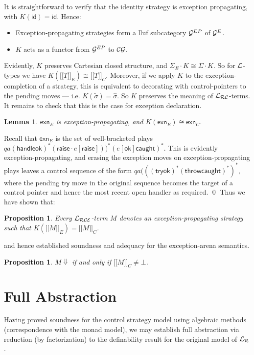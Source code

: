 \documentclass{eptcs}
\def\[{\ensuremath{[ \! [}}
\def\]{\ensuremath{] \! ]}}
\def\G{{\cal{G}}}
\def\L{{\cal{L}}}
\newcommand{\thro}{{\mathsf{throw}}}
\newcommand{\CG}{{\cal{CG}}}
\newcommand{\ok}{{\mathsf{ok}}}
\newcommand{\caught}{{\mathsf{caught}}}
\newcommand{\Lr}{{\cal{L_R}}}
\newcommand{\Lc}{{\cal{L_{RC}}}}
\newcommand{\Lce}{{\cal{L_{RCE}}}}
\newcommand{\xcell}{{\mathsf{exn}}}
\newcommand{\raze}{{\mathsf{raise}}}
\newcommand{\id}{{\mathsf{id}}}
\newtheorem{lemma}[theorem]{Lemma}
\newtheorem{proposition}[theorem]{Proposition}
\newif\ifqed
\newcommand{\qed}{\global\qedfalse\noindent\unskip\penalty50\null\nobreak\hskip1em\nobreak\hfill$\Box$}
\let\Box\undefined
\newenvironment{proof}[1][Proof]{\global\qedtrue\trivlist\item[\hskip\labelsep\textsc{#1:}]}{\ifqed\qed\fi\endtrivlist}
\begin{document}
{It is straightforward to verify that the identity strategy is exception propagating, with $K(\id) = \id$. Hence:
\begin{itemize}
\item Exception-propagating strategies  form a lluf subcategory $\G^{EP}$ of $\G^E$. 
\item $K$ acts as a functor from $\G^{EP}$ to $\CG$.
\end{itemize}
 Evidently, $K$  preserves Cartesian closed structure, and $\Sigma_E \cdot K \cong \Sigma \cdot K$. So for $\L$-types we have $K(\[T\]_{E}) \cong \[T\]_C$. Moreover, if we  apply $K$ to the exception-completion of a strategy, this is equivalent to decorating with control-pointers to the pending moves --- i.e. $K(\widetilde{\sigma}) = \widehat{\sigma}$. So $K$ preserves the meaning of $\Lc$-terms. It remains to check that this is the case for exception declaration.
\begin{lemma}$\xcell_E$ is exception-propagating, and  $K(\xcell_E) \cong \xcell_C$. 
\end{lemma}
\begin{proof}
Recall that $\xcell_E$ is the set of well-bracketed plays $qa ({\mathsf{handle}}\ok)^* (\raze\cdot e[\raze]))^*(e[\ok]\caught)^*$. This is evidently exception-propagating, and erasing the exception moves on exception-propagating plays leaves a control sequence  of the form $qa(((\mathsf{try}\ok)^*(\thro\caught)^*)^*$, where  the pending $\mathsf{try}$ move in the original sequence becomes the target of a control pointer and hence the most recent open handler as required. 
\end{proof}
Thus we have shown that:
\begin{proposition}Every $\Lce$-term $M$ denotes an exception-propagating strategy such that $K(\[M\]_{E}) = \[M\]_{C}$.  
\end{proposition}
and hence established soundness and adequacy for the exception-arena semantics. 
\begin{proposition}$M \Downarrow$ if and only if $\[M\]_C \not=\bot$.  
\end{proposition}

\section{Full Abstraction}
Having proved soundness for the control strategy model using algebraic methods (correspondence with the monad model), we may establish full abstraction  via reduction (by factorization) to the definability result for the original model of $\Lr$. 

}
\end{document}
